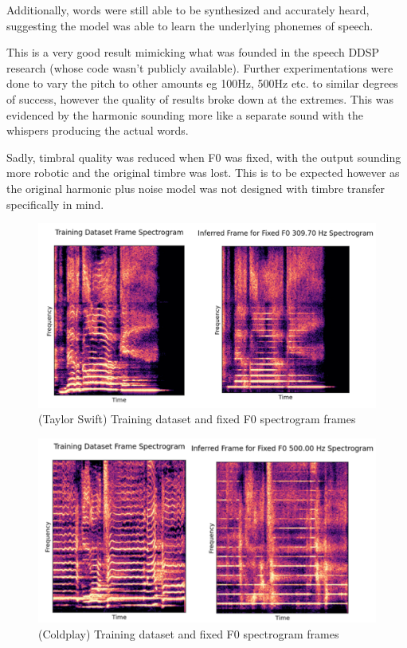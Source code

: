 Additionally, words were still able to be synthesized and accurately heard, suggesting the model was able to learn the underlying phonemes of speech.

This is a very good result mimicking what was founded in the speech DDSP research\cite{SpeechDDSP} (whose code wasn't publicly available). Further experimentations were done to vary the pitch to other amounts eg 100Hz, 500Hz etc. to similar degrees of success, however the quality of results broke down at the extremes. This was evidenced by the harmonic sounding more like a separate sound with the whispers producing the actual words.

Sadly, timbral quality was reduced when F0 was fixed, with the output sounding more robotic and the original timbre was lost. This is to be expected however as the original harmonic plus noise model was not designed with timbre transfer specifically in mind\cite{OriginalDDSP}.

\begin{figure}[!ht]
    \centering
    \includegraphics[width=\textwidth]{research/results/TaylorSwift/FixedF0.png}
    \caption{(Taylor Swift) Training dataset and fixed F0 spectrogram frames}
\end{figure}

\begin{figure}[!ht]
    \centering
    \includegraphics[width=\textwidth]{research/results/Coldplay/FixedF0.png}
    \caption{(Coldplay) Training dataset and fixed F0 spectrogram frames}
\end{figure}

